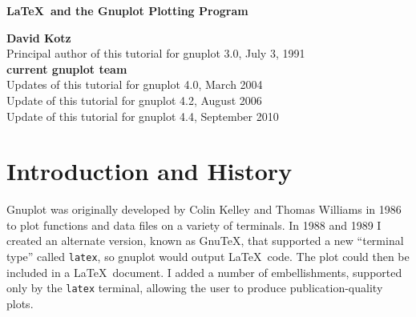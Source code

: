 %
%
%
%
%







\begin{titlepage}

\begin{center}
{\Large \bf \LaTeX\ and the Gnuplot Plotting Program}

\vskip2cm

{\bf David Kotz} \\[0.4cm]
Principal author of this tutorial for gnuplot 3.0, July 3, 1991 \\[1.0cm]

{\bf current gnuplot team} \\[0.4cm]
Updates of this tutorial for gnuplot 4.0, March 2004 \\
Update of this tutorial for gnuplot 4.2, August 2006 \\
Update of this tutorial for gnuplot 4.4, September 2010

\vskip2cm


\end{center}

\vfil
\vfil
\tableofcontents
\vfil

\end{titlepage}


\pagestyle{myheadings}

\currentspace %

\section{Introduction and History}

Gnuplot was originally developed by Colin Kelley and Thomas Williams
in 1986 to plot functions and data files on a variety of terminals.
In 1988 and 1989 I created an alternate version, known as Gnu\TeX,
that supported a new ``terminal type'' called {\tt latex}, so gnuplot
would output \LaTeX\ code. The plot could then be included in a
\LaTeX\ document. I added a number of embellishments, supported only
by the {\tt latex} terminal, allowing the user to produce
publication-quality plots.

